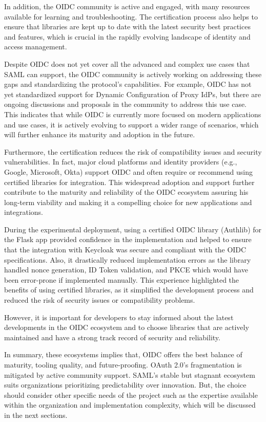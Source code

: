\documentclass[../memoire.tex]{subfiles}
\begin{document}
In addition, the OIDC community is active and engaged, with many resources available for learning and troubleshooting. The certification process also helps to ensure that libraries are kept up to date with the latest security best practices and features, which is crucial in the rapidly evolving landscape of identity and access management.

Despite OIDC does not yet cover all the advanced and complex use cases that SAML can support, the OIDC community is actively working on addressing these gaps and standardizing the protocol's capabilities. For example, OIDC has not yet standardized support for Dynamic Configuration of Proxy IdPs, but there are ongoing discussions and proposals in the community to address this use case. This indicates that while OIDC is currently more focused on modern applications and use cases, it is actively evolving to support a wider range of scenarios, which will further enhance its maturity and adoption in the future. 

Furthermore, the certification reduces the risk of compatibility issues and security vulnerabilities. In fact, major cloud platforms and identity providers (e.g., Google, Microsoft, Okta) support OIDC and often require or recommend using certified libraries for integration. This widespread adoption and support further contribute to the maturity and reliability of the OIDC ecosystem assuring his long-term viability and making it a compelling choice for new applications and integrations.

During the experimental deployment, using a certified OIDC library (Authlib) for the Flask app provided confidence in the implementation and helped to ensure that the integration with Keycloak was secure and compliant with the OIDC specifications. Also, it drastically reduced implementation errors as the library handled nonce generation, ID Token validation, and PKCE which would have been error-prone if implemented manually. This experience highlighted the benefits of using certified libraries, as it simplified the development process and reduced the risk of security issues or compatibility problems.

However, it is important for developers to stay informed about the latest developments in the OIDC ecosystem and to choose libraries that are actively maintained and have a strong track record of security and reliability.


In summary, these ecosystems implies that, OIDC offers the best balance of maturity, tooling quality, and future-proofing. OAuth 2.0's fragmentation is mitigated by active community support. SAML's stable but stagnant ecosystem suits organizations prioritizing predictability over innovation. But, the choice should consider other specific needs of the project such as the expertise available within the organization and implementation complexity, which will be discussed in the next sections. 
\end{document}
